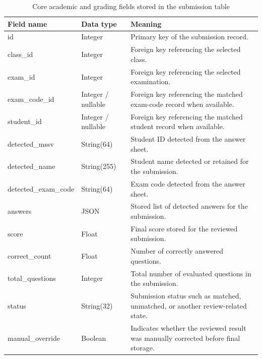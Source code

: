 \documentclass[../Main.tex]{subfiles}
\begin{document}
\begin{table}[H]
\centering
\caption{Core academic and grading fields stored in the submission table}
\label{table:submission_fields}
\scriptsize
\setlength{\tabcolsep}{3pt}
\renewcommand{\arraystretch}{1.15}
\begin{tabular}{|>{\raggedright\arraybackslash}p{}|>{\raggedright\arraybackslash}p{}|>{\raggedright\arraybackslash}p{}|}
\hline
\textbf{Field name} & \textbf{Data type} & \textbf{Meaning} \\ \hline
id & Integer & Primary key of the submission record. \\ \hline
class\_id & Integer & Foreign key referencing the selected class. \\ \hline
exam\_id & Integer & Foreign key referencing the selected examination. \\ \hline
exam\_code\_id & Integer / nullable & Foreign key referencing the matched exam-code record when available. \\ \hline
student\_id & Integer / nullable & Foreign key referencing the matched student record when available. \\ \hline
detected\_mssv & String(64) & Student ID detected from the answer sheet. \\ \hline
detected\_name & String(255) & Student name detected or retained for the submission. \\ \hline
detected\_exam\_code & String(64) & Exam code detected from the answer sheet. \\ \hline
answers & JSON & Stored list of detected answers for the submission. \\ \hline
score & Float & Final score stored for the reviewed submission. \\ \hline
correct\_count & Float & Number of correctly answered questions. \\ \hline
total\_questions & Integer & Total number of evaluated questions in the submission. \\ \hline
status & String(32) & Submission status such as matched, unmatched, or another review-related state. \\ \hline
manual\_override & Boolean & Indicates whether the reviewed result was manually corrected before final storage. \\ \hline
\end{tabular}
\end{table}
\end{document}
